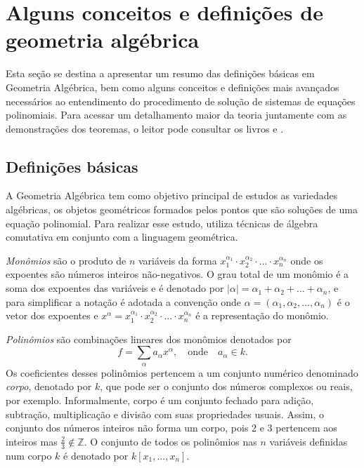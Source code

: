 \section{Alguns conceitos e definições de geometria algébrica}\label{sec.geo-algebrica}

Esta seção se destina a apresentar um resumo das definições básicas em Geometria Algébrica, bem como alguns conceitos e definições mais avançados necessários ao entendimento do procedimento de solução de sistemas de equações polinomiais. Para acessar um detalhamento maior da teoria juntamente com as demonstrações dos teoremas, o leitor pode consultar os livros \citep{cox-using} e \citep{cox-ideals}.

\subsection*{Definições básicas}

A Geometria Algébrica tem como objetivo principal de estudos as variedades algébricas, os objetos geométricos
formados pelos pontos que são soluções de uma equação polinomial. Para realizar esse
estudo, utiliza técnicas de álgebra comutativa em conjunto com a linguagem geométrica.

{\it Monômios} são o produto de $n$ variáveis da forma $x_1^{\alpha_1}\cdot x_2^{\alpha_2} \cdot ... \cdot x_n^{\alpha_n}$ onde os expoentes são números inteiros não-negativos. O grau total de um monômio é a soma dos expoentes das variáveis e é denotado por $|\alpha|=\alpha_1+\alpha_2+...+\alpha_n$, e para simplificar a notação é adotada a convenção onde $\alpha=(\alpha_1,\alpha_2,...,\alpha_n)$ é o vetor dos expoentes e $x^\alpha=x_1^{\alpha_1}\cdot x_2^{\alpha_2} \cdot ... \cdot x_n^{\alpha_n}$ é a representação do monômio.

{\it Polinômios} são combinações lineares dos monômios denotados por
\begin{equation*}
f=\sum_\alpha a_\alpha x^\alpha,\quad\text{onde}\quad a_\alpha\in k.
\end{equation*} 
Os coeficientes desses polinômios pertencem a um conjunto numérico denominado {\it corpo}, denotado por $k$, que pode ser o conjunto dos números complexos ou reais, por exemplo. Informalmente, corpo é um conjunto fechado para adição, subtração, multiplicação e divisão com suas propriedades usuais. Assim, o conjunto dos números inteiros não forma um corpo, pois 2 e 3 pertencem aos inteiros mas $\frac{2}{3}\notin\mathbb{Z}$. O conjunto de todos os polinômios nas $n$ variáveis definidas num corpo $k$ é denotado por $k[x_1,...,x_n]$.

